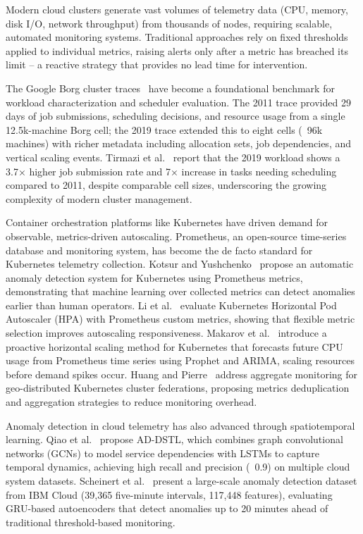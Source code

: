 Modern cloud clusters generate vast volumes of telemetry data (CPU, memory, disk I/O, network throughput) from thousands of nodes, requiring scalable, automated monitoring systems. Traditional approaches rely on fixed thresholds applied to individual metrics, raising alerts only after a metric has breached its limit -- a reactive strategy that provides no lead time for intervention.

The Google Borg cluster traces~\cite{Tirmazi20,Liu12} have become a foundational benchmark for workload characterization and scheduler evaluation. The 2011 trace provided 29 days of job submissions, scheduling decisions, and resource usage from a single 12.5k-machine Borg cell; the 2019 trace extended this to eight cells (~96k machines) with richer metadata including allocation sets, job dependencies, and vertical scaling events. Tirmazi et al.~\cite{Tirmazi20} report that the 2019 workload shows a 3.7× higher job submission rate and 7× increase in tasks needing scheduling compared to 2011, despite comparable cell sizes, underscoring the growing complexity of modern cluster management.

Container orchestration platforms like Kubernetes have driven demand for observable, metrics-driven autoscaling. Prometheus, an open-source time-series database and monitoring system, has become the de facto standard for Kubernetes telemetry collection. Kotsur and Yushchenko~\cite{PrometheusKubernetes20} propose an automatic anomaly detection system for Kubernetes using Prometheus metrics, demonstrating that machine learning over collected metrics can detect anomalies earlier than human operators. Li et al.~\cite{KubernetesHPA20} evaluate Kubernetes Horizontal Pod Autoscaler (HPA) with Prometheus custom metrics, showing that flexible metric selection improves autoscaling responsiveness. Makarov et al.~\cite{ProactiveKubernetes24} introduce a proactive horizontal scaling method for Kubernetes that forecasts future CPU usage from Prometheus time series using Prophet and ARIMA, scaling resources before demand spikes occur. Huang and Pierre~\cite{KubernetesFederation24} address aggregate monitoring for geo-distributed Kubernetes cluster federations, proposing metrics deduplication and aggregation strategies to reduce monitoring overhead.

Anomaly detection in cloud telemetry has also advanced through spatiotemporal learning. Qiao et al.~\cite{ADDSTL23} propose AD-DSTL, which combines graph convolutional networks (GCNs) to model service dependencies with LSTMs to capture temporal dynamics, achieving high recall and precision (~0.9) on multiple cloud system datasets. Scheinert et al.~\cite{CloudAnomalyIBM24} present a large-scale anomaly detection dataset from IBM Cloud (39,365 five-minute intervals, 117,448 features), evaluating GRU-based autoencoders that detect anomalies up to 20 minutes ahead of traditional threshold-based monitoring.

